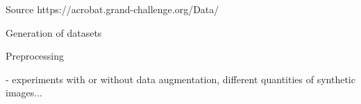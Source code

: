 
Source
https://acrobat.grand-challenge.org/Data/


Generation of datasets


Preprocessing


- experiments with or without data augmentation, different quantities of synthetic images...